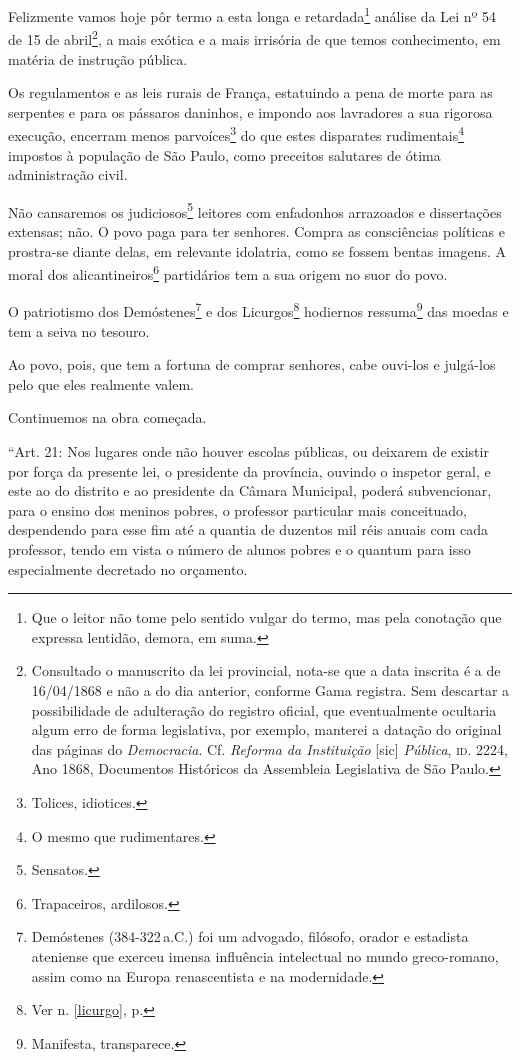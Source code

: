 Felizmente vamos hoje pôr termo a esta longa e retardada\footnote{Que
  o leitor não tome pelo sentido vulgar do termo, mas pela conotação que
  expressa lentidão, demora, em suma.} análise da Lei nº 54 de 15 de
abril\footnote{Consultado o manuscrito da lei provincial, nota-se que
  a data inscrita é a de 16/04/1868 e não a do dia anterior, conforme
  Gama registra. Sem descartar a possibilidade de adulteração do
  registro oficial, que eventualmente ocultaria algum erro de forma
  legislativa, por exemplo, manterei a datação do original das páginas
  do \emph{Democracia}. Cf. \emph{Reforma da Instituição} {[}sic{]}
  \emph{Pública}, \textsc{id}. 2224, Ano 1868, Documentos Históricos da
  Assembleia Legislativa de São Paulo.}, a mais exótica e a mais
irrisória de que temos conhecimento, em matéria de instrução pública.

Os regulamentos e as leis rurais de França, estatuindo a pena de morte
para as serpentes e para os pássaros daninhos, e impondo aos lavradores
a sua rigorosa execução, encerram menos parvoíces\footnote{Tolices,
  idiotices.} do que estes disparates rudimentais\footnote{O mesmo que
  rudimentares.} impostos à população de São Paulo, como preceitos
salutares de ótima administração civil.

Não cansaremos os judiciosos\footnote{Sensatos.} leitores com
enfadonhos arrazoados e dissertações extensas; não. O povo paga para ter
senhores. Compra as consciências políticas e prostra-se diante delas, em
relevante idolatria, como se fossem bentas imagens. A moral dos
alicantineiros\footnote{Trapaceiros, ardilosos.} partidários tem a sua
origem no suor do povo.

O patriotismo dos Demóstenes\footnote{Demóstenes (384-322\,a.C.)
  foi um advogado, filósofo, orador e estadista ateniense que exerceu
  imensa influência intelectual no mundo greco-romano, assim como na
  Europa renascentista e na modernidade.} e dos Licurgos\footnote{Ver n. 
  \ref{licurgo}, p. \pageref{licurgo}} hodiernos ressuma\footnote{Manifesta, 
  transparece.} das moedas e tem a seiva no tesouro.

Ao povo, pois, que tem a fortuna de comprar senhores, cabe ouvi-los e
julgá-los pelo que eles realmente valem.

Continuemos na obra começada.

``Art. 21: Nos lugares onde não houver escolas públicas, ou deixarem de
existir por força da presente lei, o presidente da província, ouvindo o
inspetor geral, e este ao do distrito e ao presidente da Câmara
Municipal, poderá subvencionar, para o ensino dos meninos pobres, o
professor particular mais conceituado, despendendo para esse fim até a
quantia de duzentos mil réis anuais com cada professor, tendo em vista o
número de alunos pobres e o quantum para isso especialmente decretado no
orçamento.

